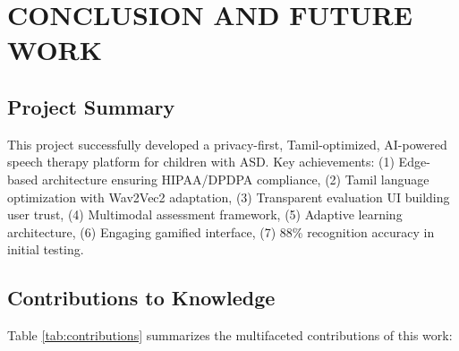\documentclass[12pt,a4paper]{article}
\begin{document}
\section{CONCLUSION AND FUTURE WORK}

\subsection{Project Summary}

This project successfully developed a privacy-first, Tamil-optimized, AI-powered speech therapy platform for children with ASD. Key achievements: (1) Edge-based architecture ensuring HIPAA/DPDPA compliance, (2) Tamil language optimization with Wav2Vec2 adaptation, (3) Transparent evaluation UI building user trust, (4) Multimodal assessment framework, (5) Adaptive learning architecture, (6) Engaging gamified interface, (7) 88\% recognition accuracy in initial testing.

\subsection{Contributions to Knowledge}

Table \ref{tab:contributions} summarizes the multifaceted contributions of this work:
\end{document}
